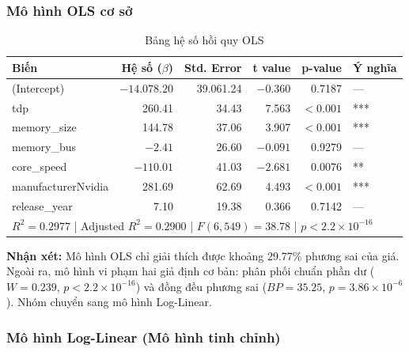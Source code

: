 \documentclass[a4paper]{article}
\begin{document}
\subsubsection{Mô hình OLS cơ sở}

\begin{table}[h!]
\centering
\caption{Bảng hệ số hồi quy OLS}
\begin{tabular}{|l|r|r|r|r|l|}
\hline
\textbf{Biến} & \textbf{Hệ số ($\beta$)} & \textbf{Std. Error} & \textbf{t value} & \textbf{p-value} & \textbf{Ý nghĩa} \\
\hline
(Intercept) & $-14.078.20$ & 39.061.24 & $-0.360$ & 0.7187 & --- \\
tdp & 260.41 & 34.43 & 7.563 & $< 0.001$ & *** \\
memory\_size & 144.78 & 37.06 & 3.907 & $< 0.001$ & *** \\
memory\_bus & $-2.41$ & 26.60 & $-0.091$ & 0.9279 & --- \\
core\_speed & $-110.01$ & 41.03 & $-2.681$ & 0.0076 & ** \\
manufacturerNvidia & 281.69 & 62.69 & 4.493 & $< 0.001$ & *** \\
release\_year & 7.10 & 19.38 & 0.366 & 0.7142 & --- \\
\hline
\multicolumn{6}{|l|}{$R^2 = 0.2977$ | Adjusted $R^2 = 0.2900$ | $F(6,549) = 38.78$ | $p < 2.2 \times 10^{-16}$} \\
\hline
\end{tabular}
\end{table}

\textbf{Nhận xét:} Mô hình OLS chỉ giải thích được khoảng 29.77\% phương sai của giá. Ngoài ra, mô hình vi phạm hai giả định cơ bản: phân phối chuẩn phần dư ($W = 0.239$, $p < 2.2 \times 10^{-16}$) và đồng đều phương sai ($BP = 35.25$, $p = 3.86 \times 10^{-6}$). Nhóm chuyển sang mô hình Log-Linear.

\subsubsection{Mô hình Log-Linear (Mô hình tinh chỉnh)}
\end{document}
